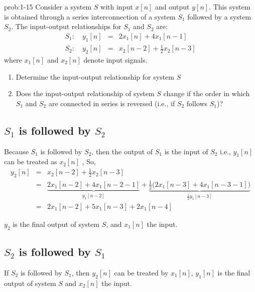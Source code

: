 \documentclass[koma,a4paper,utopia,12pt,listings-color,microtype,paralist,colorlinks,urlcolor=red]{org-article}
\begin{document}
\begin{prob}[]{prob:1-15}
Consider a system \(S\) with input \(x[n]\) and output \(y[n]\). This
system is obtained through a series interconnection of a system \(S_{1}\)
followed by a system \(S_{2}\). The input-output relationships for
\(S_{1}\) and \(S_{2}\) are:
\begin{eqnarray*}
S_{1}:\quad  y_{1}[n]&=& 2x_{1}[n] + 4x_{1}[n-1] \\
S_{2}:\quad  y_{2}[n]&=& x_{2}[n-2] + \frac{1}{2}x_{2}[n-3]
\end{eqnarray*}
where \(x_{1}[n]\) and \(x_{2}[n]\) denote input signals.
\begin{enumerate}
\item Determine the input-output relationship for system \(S\)
\item Does the input-output relationship of system \(S\) change if the order
in which \(S_{1}\) and \(S_{2}\) are connected in series is reversed
(i.e., if \(S_{2}\) follows \(S_{1}\))?
\end{enumerate}
\label{prob:1-15}
\end{prob}


\subsection{\(S_{1}\) is followed by \(S_{2}\)}
\label{sec:orgf5adda9}
Because \(S_{1}\) is followed by \(S_{2}\), then the output of \(S_{1}\) is the
input of \(S_{2}\) i.e., \(y_{1}[n]\) can be treated as \(x_{2}[n]\) , So,
\begin{eqnarray*}
y_{2}[n]&=& x_{2}[n-2] + \frac{1}{2}x_{2}[n-3] \\
&=& \underbrace{2x_{1}[n-2] + 4x_{1}[n-2-1]}_{y_{1}[n-2]}  + \underbrace{\tfrac{1}{2} \Big( 2x_{1}[n-3] + 4x_{1}[n-3-1] \Big)}_{\frac{1}{2}y_{1}[n-3]} \\
&=& 2x_{1}[n-2] + 5x_{1}[n-3] + 2x_{1}[n-4]
\end{eqnarray*}

\(y_{2}\) is the final output of system \(S\), and \(x_{1}[n]\) the input.

\subsection{\(S_{2}\) is followed by \(S_{1}\)}
\label{sec:org515eee7}


If \(S_{2}\) is followed by \(S_{1}\), then \(y_{2}[n]\) can be treated by
\(x_{1}[n]\), \(y_{1}[n]\) is the final output of system \(S\) and \(x_{2}[n]\)
the input.
\end{document}
